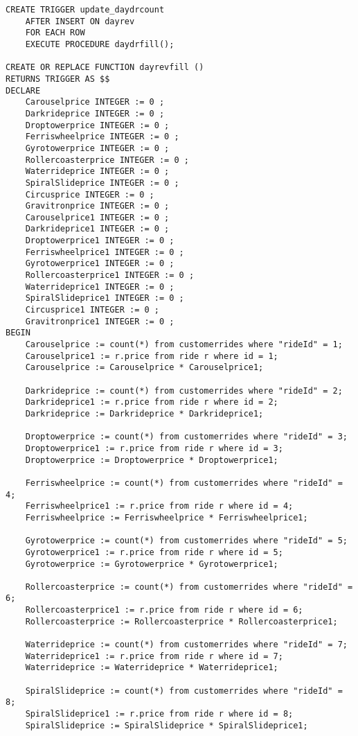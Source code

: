 \begin{verbatim}
CREATE TRIGGER update_daydrcount
    AFTER INSERT ON dayrev
    FOR EACH ROW
    EXECUTE PROCEDURE daydrfill();

CREATE OR REPLACE FUNCTION dayrevfill ()
RETURNS TRIGGER AS $$
DECLARE
    Carouselprice INTEGER := 0 ;
    Darkrideprice INTEGER := 0 ;
    Droptowerprice INTEGER := 0 ;
    Ferriswheelprice INTEGER := 0 ;
    Gyrotowerprice INTEGER := 0 ;
    Rollercoasterprice INTEGER := 0 ;
    Waterrideprice INTEGER := 0 ;
    SpiralSlideprice INTEGER := 0 ;
    Circusprice INTEGER := 0 ;
    Gravitronprice INTEGER := 0 ;
    Carouselprice1 INTEGER := 0 ;
    Darkrideprice1 INTEGER := 0 ;
    Droptowerprice1 INTEGER := 0 ;
    Ferriswheelprice1 INTEGER := 0 ;
    Gyrotowerprice1 INTEGER := 0 ;
    Rollercoasterprice1 INTEGER := 0 ;
    Waterrideprice1 INTEGER := 0 ;
    SpiralSlideprice1 INTEGER := 0 ;
    Circusprice1 INTEGER := 0 ;
    Gravitronprice1 INTEGER := 0 ;
BEGIN
    Carouselprice := count(*) from customerrides where "rideId" = 1;
    Carouselprice1 := r.price from ride r where id = 1;
    Carouselprice := Carouselprice * Carouselprice1;

    Darkrideprice := count(*) from customerrides where "rideId" = 2;
    Darkrideprice1 := r.price from ride r where id = 2;
    Darkrideprice := Darkrideprice * Darkrideprice1;

    Droptowerprice := count(*) from customerrides where "rideId" = 3;
    Droptowerprice1 := r.price from ride r where id = 3;
    Droptowerprice := Droptowerprice * Droptowerprice1;

    Ferriswheelprice := count(*) from customerrides where "rideId" = 4;
    Ferriswheelprice1 := r.price from ride r where id = 4;
    Ferriswheelprice := Ferriswheelprice * Ferriswheelprice1;

    Gyrotowerprice := count(*) from customerrides where "rideId" = 5;
    Gyrotowerprice1 := r.price from ride r where id = 5;
    Gyrotowerprice := Gyrotowerprice * Gyrotowerprice1;

    Rollercoasterprice := count(*) from customerrides where "rideId" = 6;
    Rollercoasterprice1 := r.price from ride r where id = 6;
    Rollercoasterprice := Rollercoasterprice * Rollercoasterprice1;

    Waterrideprice := count(*) from customerrides where "rideId" = 7;
    Waterrideprice1 := r.price from ride r where id = 7;
    Waterrideprice := Waterrideprice * Waterrideprice1;

    SpiralSlideprice := count(*) from customerrides where "rideId" = 8;
    SpiralSlideprice1 := r.price from ride r where id = 8;
    SpiralSlideprice := SpiralSlideprice * SpiralSlideprice1;


\end{verbatim}
